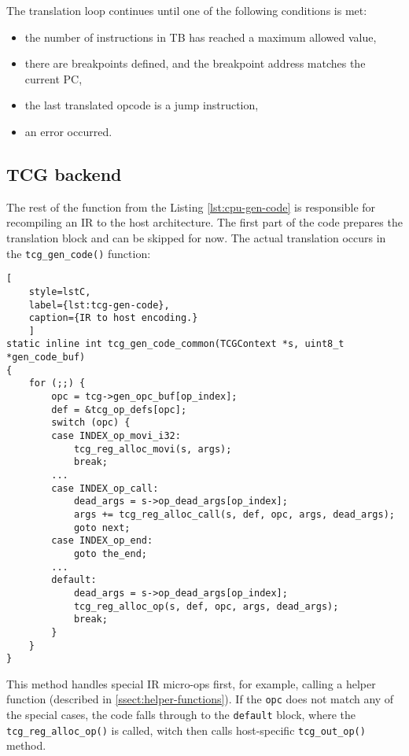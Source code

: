 \noindent
The translation loop continues until one of the following conditions is met:
\begin{itemize}
    \setlength\itemsep{0.1em}
    \item{the number of instructions in TB has reached a maximum allowed value,}
    \item{there are breakpoints defined, and the breakpoint address matches the current PC,}
    \item{the last translated opcode is a jump instruction,}
    \item{an error occurred.}
\end{itemize}

\pagebreak
\subsection{TCG backend}

The rest of the function from the Listing \ref{lst:cpu-gen-code} is responsible for recompiling an IR to the host architecture.
The first part of the code prepares the translation block and can be skipped for now. The actual translation occurs
in the \texttt{tcg\_gen\_code()} function:

\begin{lstlisting}[
    style=lstC,
    label={lst:tcg-gen-code},
    caption={IR to host encoding.}
    ]
static inline int tcg_gen_code_common(TCGContext *s, uint8_t *gen_code_buf)
{
    for (;;) {
        opc = tcg->gen_opc_buf[op_index];
        def = &tcg_op_defs[opc];
        switch (opc) {
        case INDEX_op_movi_i32:
            tcg_reg_alloc_movi(s, args);
            break;
        ...
        case INDEX_op_call:
            dead_args = s->op_dead_args[op_index];
            args += tcg_reg_alloc_call(s, def, opc, args, dead_args);
            goto next;
        case INDEX_op_end:
            goto the_end;
        ...
        default:
            dead_args = s->op_dead_args[op_index];
            tcg_reg_alloc_op(s, def, opc, args, dead_args);
            break;
        }
    }
}
\end{lstlisting}

\noindent
This method handles special IR micro-ops first, for example, calling a helper function (described
in \ref{ssect:helper-functions}). If the \texttt{opc} does not match any of the special cases, the code falls through to the \texttt{default}
block, where the \texttt{tcg\_reg\_alloc\_op()} is called, witch then calls host-specific \texttt{tcg\_out\_op()} method.

